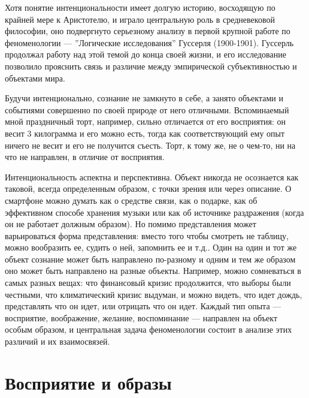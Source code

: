 \documentclass[11pt]{book}
\begin{document}
Хотя понятие интенциональности имеет долгую историю, восходящую по крайней мере к Аристотелю, и играло центральную роль в средневековой философии, оно подвергнуто серьезному анализу в первой крупной работе по феноменологии --- ''Логические исследования'' Гуссерля (1900-1901). Гуссерль продолжал работу над этой темой до конца своей жизни, и его исследование позволило прояснить связь и различие между эмпирической субъективностью и объектами мира.

Будучи интенционально, сознание не замкнуто в себе, а занято объектами и событиями совершенно по своей природе от него отличными. Вспоминаемый мной праздничный торт, например, сильно отличается от его восприятия: он весит 3 килограмма и его можно есть, тогда как соответствующий ему опыт ничего не весит и его не получится съесть. Торт, к тому же, не о чем-то, ни на что не направлен, в отличие от восприятия.

Интенциональность аспектна и перспективна. Объект никогда не осознается как таковой, всегда определенным образом, с точки зрения или через описание. О смартфоне можно думать как о средстве связи, как о подарке, как об эффективном способе хранения музыки или как об источнике раздражения (когда он не работает должным образом). Но помимо представления может варьироваться форма представления: вместо того чтобы смотреть не таблицу, можно вообразить ее, судить о ней, запомнить ее и т.д.. Один на один и тот же объект сознание может быть направлено по-разному и одним и тем же образом оно может быть направлено на разные объекты. Например, можно сомневаться в самых разных вещах: что финансовый кризис продолжится, что выборы были честными, что климатический кризис выдуман, и можно видеть, что идет дождь, представлять что он идет, или отрицать что он идет. Каждый тип опыта --- восприятие, воображение, желание, воспоминание --- направлен на объект особым образом, и центральная задача феноменологии состоит в анализе этих различий и их взаимосвязей.

\section{Восприятие и образы}
\end{document}
